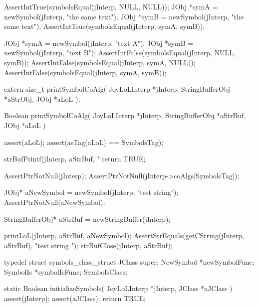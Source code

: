 
\startCTest
  AssertIntTrue(symbolsEqual(jInterp, NULL, NULL));
  JObj *symA = newSymbol(jInterp, "the same text");
  JObj *symB = newSymbol(jInterp, "the same text");
  AssertIntTrue(symbolsEqual(jInterp, symA, symB));
\stopCTest
\stopTestCase


\startCTest
  JObj *symA = newSymbol(jInterp, "text A");
  JObj *symB = newSymbol(jInterp, "text B");
  AssertIntFalse(symbolsEqual(jInterp, NULL, symB));
  AssertIntFalse(symbolsEqual(jInterp, symA, NULL));
  AssertIntFalse(symbolsEqual(jInterp, symA, symB));
\stopCTest
\stopTestCase
\stopTestSuite



\startCHeader
extern size_t printSymbolCoAlg(
  JoyLoLInterp    *jInterp,
  StringBufferObj *aStrObj,
  JObj        *aLoL
);
\stopCHeader
{}

\startCCode
Boolean printSymbolCoAlg(
  JoyLoLInterp    *jInterp,
  StringBufferObj *aStrBuf,
  JObj        *aLoL
) {
  assert(aLoL);
  assert(asTag(aLoL) == SymbolsTag);

  strBufPrintf(jInterp, aStrBuf, "%
  return TRUE;
}
\stopCCode


\startCTest
  AssertPtrNotNull(jInterp);
  AssertPtrNotNull(jInterp->coAlgs[SymbolsTag]);

  JObj* aNewSymbol = newSymbol(jInterp, "test string");
  AssertPtrNotNull(aNewSymbol);
  
  StringBufferObj* aStrBuf = newStringBuffer(jInterp);
  
  printLoL(jInterp, aStrBuf, aNewSymbol);
  AssertStrEquals(getCString(jInterp, aStrBuf),
    "test string ");
  strBufClose(jInterp, aStrBuf);
\stopCTest
\stopTestCase
\stopTestSuite

\startTestSuite[registerSymbols]

\startCHeader
typedef struct symbols_class_struct {
  JClass  super;
  NewSymbol  *newSymbolFunc;
  SymbolIs   *symbolIsFunc;
} SymbolsClass;
\stopCHeader

\startCCode
static Boolean initializeSymbols(
  JoyLoLInterp *jInterp,
  JClass   *aJClass
) {
  assert(jInterp);
  assert(aJClass);
  return TRUE;
}
\stopCCode

